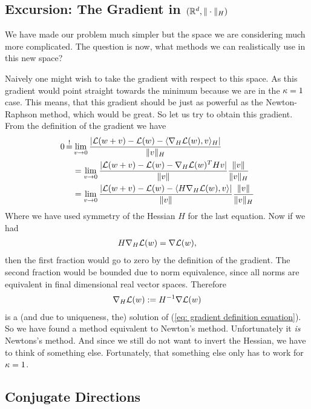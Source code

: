 \subsection{Excursion: The Gradient in \((\mathbb{R}^d, \|\cdot\|_H)\)}

We have made our problem much simpler but the space we are considering much
more complicated. The question is now, what methods we can realistically use
in this new space?

Naively one might wish to take the gradient with respect to this space. As this
gradient would point straight towards the minimum because we are in the
\(\kappa=1\) case. This means, that this gradient should be just as
powerful as the Newton-Raphson method, which would be great. So let us try to
obtain this gradient. From the definition of the gradient we have
\begin{align}
	\label{eq: gradient definition equation}
	0\xeq{!}&\lim_{v\to 0}\frac{
		|\Loss(\weights + v) - \Loss(\weights) - \langle \nabla_H\Loss(\weights), v\rangle_H |
	}{\|v\|_H}\\
	\nonumber
	&=\lim_{v\to 0}\frac{
		|\Loss(\weights + v) - \Loss(\weights) -  \nabla_H\Loss(\weights)^T H v |
	}{\|v\|}
	\frac{\|v\|}{\|v\|_H}\\
	\nonumber
	&=\lim_{v\to 0}\frac{
		|\Loss(\weights + v) - \Loss(\weights) -  \langle H\nabla_H\Loss(\weights), v\rangle |
	}{\|v\|}
	\frac{\|v\|}{\|v\|_H}
\end{align}
Where we have used symmetry of the Hessian \(H\) for the last equation. Now if
we had
\begin{align*}
	H \nabla_H \mathcal{L}(w) = \nabla\mathcal{L}(w),
\end{align*}
then the first fraction would go to zero by the definition of the gradient.
The second fraction would be bounded due to norm equivalence, since all norms
are equivalent in final dimensional real vector spaces. Therefore
\begin{align*}
	\nabla_H \mathcal{L}(w) := H^{-1}\nabla\mathcal{L}(w)
\end{align*}
is a (and due to uniqueness, the) solution of (\ref{eq: gradient definition
equation}). So we have found a method equivalent to Newton's method.
Unfortunately it \emph{is} Newtons's method. And since we still do not want
to invert the Hessian, we have to think of something else. Fortunately, that
something else only has to work for \(\kappa=1\).

\subsection{Conjugate Directions}


